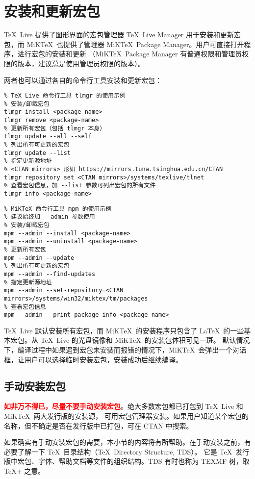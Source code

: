 \section{安装和更新宏包}\label{sec:pkg-manager}

\TeX\ Live 提供了图形界面的宏包管理器 \TeX\ Live Manager 用于安装和更新宏包，而 MiK\-\TeX\ 也提供了管理器
MiK\-\TeX\ Package Manager。用户可直接打开程序，进行宏包的安装和更新
（MiK\-\TeX\ Package Manager 有普通权限和管理员权限的版本，建议总是使用管理员权限的版本）。

两者也可以通过各自的命令行工具安装和更新宏包：
\begin{verbatim}
% TeX Live 命令行工具 tlmgr 的使用示例
% 安装/卸载宏包
tlmgr install <package-name>
tlmgr remove <package-name>
% 更新所有宏包（包括 tlmgr 本身）
tlmgr update --all --self
% 列出所有可更新的宏包
tlmgr update --list
% 指定更新源地址
% <CTAN mirrors> 形如 https://mirrors.tuna.tsinghua.edu.cn/CTAN
tlmgr repository set <CTAN mirrors>/systems/texlive/tlnet
% 查看宏包信息，加 --list 参数可列出宏包的所有文件
tlmgr info <package-name>
\end{verbatim}

\begin{verbatim}
% MiKTeX 命令行工具 mpm 的使用示例
% 建议始终加 --admin 参数使用
% 安装/卸载宏包
mpm --admin --install <package-name>
mpm --admin --uninstall <package-name>
% 更新所有宏包
mpm --admin --update
% 列出所有可更新的宏包
mpm --admin --find-updates
% 指定更新源地址
mpm --admin --set-repository=<CTAN mirrors>/systems/win32/miktex/tm/packages
% 查看宏包信息
mpm --admin --print-package-info <package-name>
\end{verbatim}

\TeX\ Live 默认安装所有宏包，而 MiK\TeX\ 的安装程序只包含了 \LaTeX\ 的一些基本宏包。从 \TeX\ Live 的光盘镜像和 MiK\-\TeX\ 的安装包体积可见一斑。
默认情况下，编译过程中如果遇到宏包未安装而报错的情况下，MiK\TeX\ 会弹出一个对话框，让用户可以选择临时安装宏包，安装成功后继续编译。

\subsection{手动安装宏包}\label{subsec:pkg-manual-install}

\textbf{\textcolor{red}{如非万不得已，尽量不要手动安装宏包}}。绝大多数宏包都已打包到 \TeX\ Live 和 MiK\TeX\ 两大发行版的安装源，
可用宏包管理器安装。如果用户知道某个宏包的名称，但不确定是否在发行版中已打包，可在 CTAN 中搜索。

如果确实有手动安装宏包的需要，本小节的内容将有所帮助。在手动安装之前，有必要了解一下 \TeX\ 目录结构（\TeX\ Directory Structure, TDS）。
它是 \TeX\ 发行版中宏包、字体、帮助文档等文件的组织结构。TDS 有时也称为 TEXMF 树，取 \TeX$+$ 之意。

